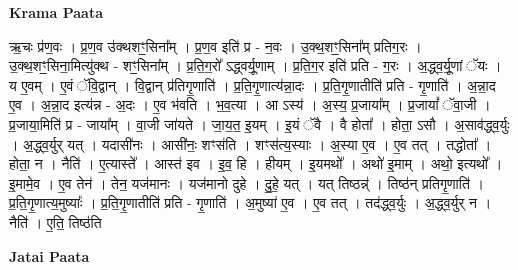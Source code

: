 \documentclass[17pt]{extarticle}
\begin{document}
\textbf{Krama Paata} \newline

ऋ॒चः प्र॑ण॒वः । प्र॒ण॒व उ॑क्थशꣳ॒॒सिना᳚म् । प्र॒ण॒व इति॑ प्र - न॒वः । उ॒क्थ॒शꣳ॒॒सिना᳚म् प्रतिग॒रः । उ॒क्थ॒शꣳ॒॒सिना॒मित्यु॑क्थ - शꣳ॒॒सिना᳚म् । प्र॒ति॒ग॒रो᳚ ऽद्ध्वर्यू॒णाम् । प्र॒ति॒ग॒र इति॑ प्रति - ग॒रः । अ॒द्ध्व॒र्यू॒णां ॅयः । य ए॒वम् । ए॒वं ॅवि॒द्वान् । वि॒द्वान् प्र॑तिगृ॒णाति॑ । प्र॒ति॒गृ॒णात्य॑न्ना॒दः । प्र॒ति॒गृ॒णातीति॑ प्रति - गृ॒णाति॑ । अ॒न्ना॒द ए॒व । अ॒न्ना॒द इत्य॑न्न - अ॒दः । ए॒व भ॑वति । भ॒व॒त्या । आ ऽस्य॑ । अ॒स्य॒ प्र॒जाया᳚म् । प्र॒जायां᳚ ॅवा॒जी । प्र॒जाया॒मिति॑ प्र - जाया᳚म् । वा॒जी जा॑यते । जा॒य॒त॒ इ॒यम् । इ॒यं ॅवै । वै होता᳚ । होता॒ ऽसौ । अ॒साव॑द्ध्व॒र्युः । अ॒द्ध्व॒र्युर् यत् । यदासी॑नः । आसी॑नः॒ शꣳस॑ति । शꣳस॑त्य॒स्याः । अ॒स्या ए॒व । ए॒व तत् । तद्धोता᳚ । होता॒ न । नैति॑ । ए॒त्यास्ते᳚ । आस्त॑ इव । इ॒व॒ हि । हीयम् । इ॒यमथो᳚ । अथो॑ इ॒माम् । अथो॒ इत्यथो᳚ । इ॒मामे॒व । ए॒व तेन॑ । तेन॒ यज॑मानः । यज॑मानो दुहे । दु॒हे॒ यत् । यत् तिष्ठन्न्॑ । तिष्ठ॑न् प्रतिगृ॒णाति॑ । प्र॒ति॒गृ॒णात्य॒मुष्याः᳚ । प्र॒ति॒गृ॒णातीति॑ प्रति - गृ॒णाति॑ । अ॒मुष्या॑ ए॒व । ए॒व तत् । तद॑द्ध्व॒र्युः । अ॒द्ध्व॒र्युर् न । नैति॑ । ए॒ति॒ तिष्ठ॑ति \newline

\textbf{Jatai Paata} \newline
\end{document}
